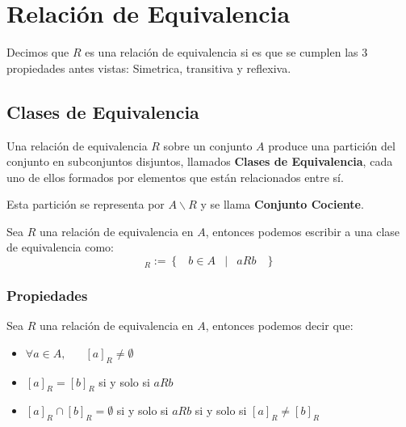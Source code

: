 \documentclass[12pt, fleqn]{report}                             %
\DeclareMathOperator \Space {\quad}                             %
\DeclareMathOperator \MiniSpace {\;}                            %
\newcommand \Such {\MiniSpace|\MiniSpace}                       %
\newcommand{\Set}[1]{\left\{ \MiniSpace #1 \MiniSpace \right\}} %
\begin{document}
        \clearpage
        \section{Relación de Equivalencia}
            Decimos que $R$ es una relación de equivalencia si es que se cumplen las 3
            propiedades antes vistas: Simetrica, transitiva y reflexiva.


            \subsection{Clases de Equivalencia}

                Una relación de equivalencia $R$ sobre un conjunto $A$ produce una partición
                del conjunto en subconjuntos disjuntos, llamados \textbf{Clases de
                Equivalencia}, cada uno de ellos formados por elementos que están
                relacionados entre sí.

                Esta partición se representa por $A \backslash R$ y se llama
                \textbf{Conjunto Cociente}.

                Sea $R$ una relación de equivalencia en $A$, entonces podemos escribir
                a una clase de equivalencia como:
                \begin{equation*}
                    [a]_R := \Set{ b \in A \Such a R b}
                \end{equation*} 


                    \subsubsection{Propiedades}

                    Sea $R$ una relación de equivalencia en $A$, entonces podemos decir que:
                    \begin{itemize}

                        \item $\forall a \in A, \Space [a]_R \neq \emptyset$

                        \item $[a]_R = [b]_R$ si y solo si $a R b$

                        \item $[a]_R \cap [b]_R = \emptyset$ si y solo si $a R b$ si y solo si
                            $[a]_R \neq [b]_R$

                    \end{itemize}
\end{document}
